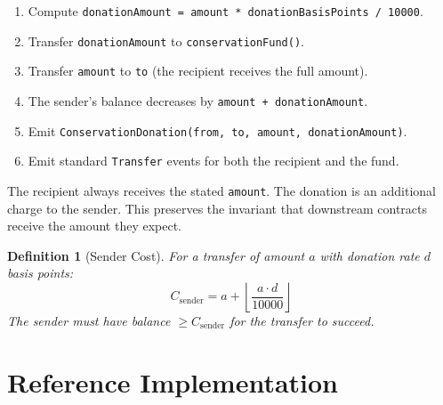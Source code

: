 \documentclass[11pt,letterpaper]{article}
\newtheorem{definition}{Definition}[section]
\begin{document}
\begin{enumerate}
    \item Compute \texttt{donationAmount = amount * donationBasisPoints / 10000}.
    \item Transfer \texttt{donationAmount} to \texttt{conservationFund()}.
    \item Transfer \texttt{amount} to \texttt{to} (the recipient receives the full amount).
    \item The sender's balance decreases by \texttt{amount + donationAmount}.
    \item Emit \texttt{ConservationDonation(from, to, amount, donationAmount)}.
    \item Emit standard \texttt{Transfer} events for both the recipient and the fund.
\end{enumerate}

The recipient always receives the stated \texttt{amount}. The donation is an additional charge to the sender. This preserves the invariant that downstream contracts receive the amount they expect.

\begin{definition}[Sender Cost]
For a transfer of amount $a$ with donation rate $d$ basis points:
\begin{equation}
C_{\text{sender}} = a + \left\lfloor \frac{a \cdot d}{10000} \right\rfloor
\end{equation}
The sender must have balance $\geq C_{\text{sender}}$ for the transfer to succeed.
\end{definition}

\section{Reference Implementation}
\label{sec:implementation}
\end{document}
